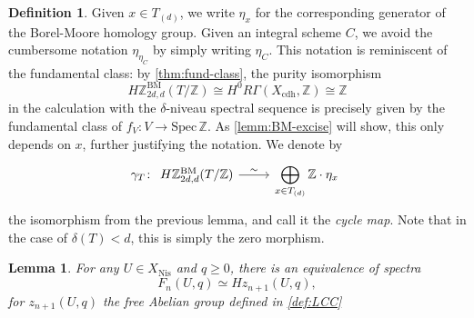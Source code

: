 \documentclass[11pt, twoside]{article}
\numberwithin{equation}{section}
\newtheorem{lemma}[equation]{Lemma}
\theoremstyle{definition}
\newtheorem{definition}[equation]{Definition}
\newcommand{\bb}[1]{\mathbb{#1}}
\newcommand{\spec}{\mathrm{Spec} \,}
\newcommand{\bm}{\mathrm{BM}}
\newcommand{\nis}{\mathrm{Nis}}
\begin{document}
\begin{definition}
Given \(x \in T_{(d)}\), we write \(\eta_x\) for the corresponding generator of the Borel-Moore homology group. Given an integral scheme \(C\), we avoid the cumbersome notation \(\eta_{\eta_C}\) by simply writing \(\eta_C\). This notation is reminiscent of the fundamental class: by \ref{thm:fund-class}, the purity isomorphism
\[H\bb{Z}_{2d, d}^\bm(T/\bb{Z}) \cong H^0 R\Gamma(X_\mathrm{cdh}, \bb{Z}) \cong \bb{Z}\]
in the calculation with the \(\delta\)-niveau spectral sequence is precisely given by the fundamental class of \(f_V \colon V \to \spec \bb{Z}\). As \ref{lemm:BM-excise} will show, this only depends on \(x\), further justifying the notation. We denote by 
\[\gamma_T \colon \begin{tikzcd} H\bb{Z}_{2d, d}^\bm(T/\bb{Z}) \ar[r, "\sim"] & \displaystyle \bigoplus_{x \in T_{(d)}} \bb{Z} \cdot \eta_x \end{tikzcd}\]
the isomorphism from the previous lemma, and call it the \emph{cycle map}. Note that in the case of \(\delta(T) < d\), this is simply the zero morphism.
\end{definition}

\begin{lemma}\label{lemm:EM}
For any \(U \in X_\nis\) and \(q \geq 0\), there is an equivalence of spectra 
\begin{equation}\label{eq:EM}
F_n(U, q) \simeq Hz_{n +1}(U, q),
\end{equation}
for \(z_{n + 1}(U, q)\) the free Abelian group defined in \ref{def:LCC}
\end{lemma}
\end{document}
